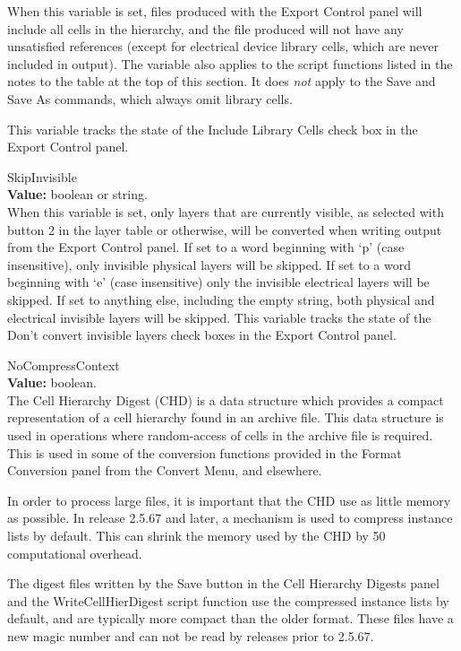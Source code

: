 \begin{description}
When this variable is set, files produced with the {\cb Export
Control} panel will include all cells in the hierarchy, and the file
produced will not have any unsatisfied references (except for
electrical device library cells, which are never included in output). 
The variable also applies to the script functions listed in the notes
to the table at the top of this section.  It does {\it not} apply to
the {\cb Save} and {\cb Save As} commands, which always omit library
cells.

This variable tracks the state of the {\cb Include Library Cells}
check box in the {\cb Export Control} panel.

\item{\et SkipInvisible}\\
{\bf Value:} boolean or string.\\
When this variable is set, only layers that are currently visible, as
selected with button 2 in the layer table or otherwise, will be
converted when writing output from the {\cb Export Control} panel.  If
set to a word beginning with `{\vt p}' (case insensitive), only
invisible physical layers will be skipped.  If set to a word beginning
with `{\vt e}' (case insensitive) only the invisible electrical layers
will be skipped.  If set to anything else, including the empty string,
both physical and electrical invisible layers will be skipped.  This
variable tracks the state of the {\cb Don't convert invisible layers}
check boxes in the {\cb Export Control} panel.

\item{\et NoCompressContext}\\
{\bf Value:} boolean.\\
The Cell Hierarchy Digest (CHD) is a data structure which provides a
compact representation of a cell hierarchy found in an archive file. 
This data structure is used in operations where random-access of cells
in the archive file is required.  This is used in some of the
conversion functions provided in the {\cb Format Conversion} panel
from the {\cb Convert Menu}, and elsewhere.

In order to process large files, it is important that the CHD use as
little memory as possible.  In release 2.5.67 and later, a mechanism
is used to compress instance lists by default.  This can shrink the
memory used by the CHD by 50%
computational overhead.

The digest files written by the {\cb Save} button in the {\cb Cell
Hierarchy Digests} panel and the {\vt WriteCellHierDigest} script
function use the compressed instance lists by default, and are
typically more compact than the older format.  These files have a new
magic number and can not be read by {\Xic} releases prior to 2.5.67.


\end{description}
